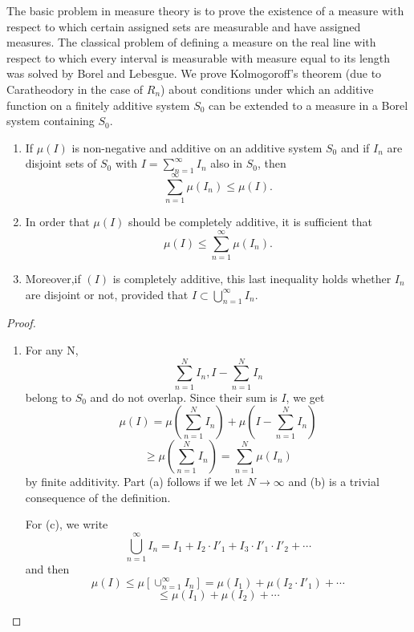 The basic problem in measure theory is to prove the existence of a
measure with respect to which certain assigned sets are measurable and
have assigned measures.  The classical problem of defining a measure
on the real line with respect to which every interval is measurable
with measure equal to its length was solved by Borel and Lebesgue.  We
prove Kolmogoroff's theorem (due to Caratheodory in the case of $R_n$)
about conditions under which an additive function on a finitely
additive system $S_0$ can be extended to a measure in a Borel system
containing $S_0$. 

\setcounter{theorem}{3}
\begin{theorem}\label{chap1:sec6:thm4}
\begin{enumerate}
\renewcommand{\theenumi}{\alph{enumi}}
\renewcommand{\labelenumi}{(\theenumi)}
\item If $\mu(I)$ is non-negative and additive on an additive system
  $S_0$ and if $I_n$ are disjoint sets of $S_0$ with 
  $I = \sum\limits^{\infty}_{n=1}I_n$ also in $S_0$, then
  $$
  \sum^{\infty}_{n=1} \mu(I_n) \leq \mu (I).
  $$
  
\item In order that  $\mu(I)$ should be completely additive, it is
  sufficient that 
  $$
  \mu(I)\leq \sum^{\infty}_{n=1} \mu (I_n).
  $$
  
\item Moreover,\pageoriginale if $(I)$ is completely additive, this last inequality holds
  whether $I_n$ are disjoint or not, provided that  
  $I\subset \bigcup\limits^{\infty}_{n=1} I_n$.
\end{enumerate}
\end{theorem}

\begin{proof}
\begin{enumerate}
\renewcommand{\theenumi}{\alph{enumi}}
\renewcommand{\labelenumi}{(\theenumi)}
\item For any N,
$$
\sum^{N}_{n=1} I_n, I - \sum^{N}_{n=1} I_n 
$$
belong to $S_0$ and do not overlap.  Since their sum is $I$, we get
$$
\mu(I) = \mu\left(\sum^{N}_{n=1} I_n\right) + \mu\left(I
-\sum^{N}_{n=1} I_n\right)
$$
$$
\geq \mu \left(\sum^{N}_{n=1}  I_n\right) = \sum^{N}_{n=1} \mu(I_n)
$$
by finite additivity.  Part (a) follows if we let $N \rightarrow
\infty$ and (b) is a trivial consequence of the definition. 

For (c), we write
$$
\bigcup^{\infty}_{n=1} I_n=I_1 + I_2\cdot I'_1 + I_3
\cdot I'_1\cdot I'_2 + \cdots
$$
and then
$$
\mu(I)\leq \mu [\cup^{\infty}_{n=1} I_n] =  \mu(I_1)
+ \mu (I_2\cdot I'_1) + \cdots
$$
$$
\leq \mu(I_1) + \mu(I_2) + \cdots
$$
\end{enumerate}
\end{proof}

